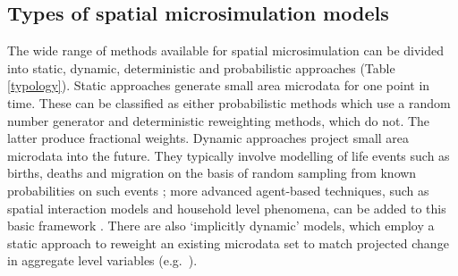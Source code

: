 \documentclass[a4paper, 11pt, twoside]{Thesis}
\begin{document}
\subsection{Types of spatial microsimulation models} 
\label{types-msim}
The wide range of methods available for spatial microsimulation can be divided
into static, dynamic, deterministic and probabilistic approaches (Table
\ref{typology}). Static approaches generate small
area microdata for one point in time. These can be classified as
either probabilistic methods which use a random number generator and
deterministic reweighting methods, which do not. The latter produce
fractional weights. Dynamic approaches project small
area microdata into the future. They typically involve modelling of
life events such as births, deaths and migration on the basis of random
sampling from known probabilities on such events \citep{Ballas2005c,
Vidyattama2010}; more advanced agent-based techniques, such as spatial
interaction models and household level phenomena, can be added to this basic
framework \citep{Wu2008, Wu2010}. There
are also `implicitly dynamic' models, which employ a static
approach to reweight an existing microdata set to match
projected change in aggregate level variables
(e.g.~\citealp{Ballas2005-ireland}).
\end{document}
